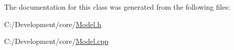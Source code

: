 The documentation for this class was generated from the following files\-:\begin{DoxyCompactItemize}
\item 
C\-:/\-Development/core/\hyperlink{_model_8h}{Model.\-h}\item 
C\-:/\-Development/core/\hyperlink{_model_8cpp}{Model.\-cpp}\end{DoxyCompactItemize}
